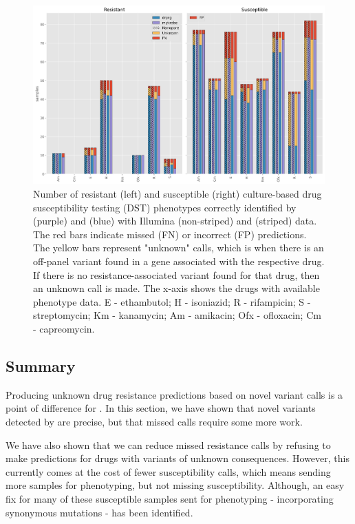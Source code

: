 \begin{figure}
\begin{center}
\includegraphics[width=0.90\columnwidth]{Chapter3/Figs/pheno_unknown.png}
\caption{{Number of resistant (left) and susceptible (right) culture-based drug susceptibility testing (DST) phenotypes correctly identified by \mykrobe{} (purple) and \drprg{} (blue) with Illumina (non-striped) and \ont{} (striped) data. The red bars indicate missed (FN) or incorrect (FP) predictions. The yellow bars represent \drprg{} "unknown" calls, which is when there is an off-panel variant found in a gene associated with the respective drug. If there is no resistance-associated variant found for that drug, then an unknown call is made. The x-axis shows the drugs with available phenotype data. E - ethambutol; H - isoniazid; R - rifampicin; S - streptomycin; Km - kanamycin; Am - amikacin; Ofx - ofloxacin; Cm - capreomycin.
{\label{fig:pheno-unknown}}
}}
\end{center}
\end{figure}

\subsection{Summary}

Producing unknown drug resistance predictions based on novel variant calls is a point of difference for \drprg{}. In this section, we have shown that novel variants detected by \drprg{} are precise, but that missed calls require some more work.

We have also shown that we can reduce missed resistance calls by refusing to make predictions for drugs with variants of unknown consequences. However, this currently comes at the cost of fewer susceptibility calls, which means sending more samples for phenotyping, but not missing susceptibility. Although, an easy fix for many of these susceptible samples sent for phenotyping - incorporating synonymous mutations - has been identified.

